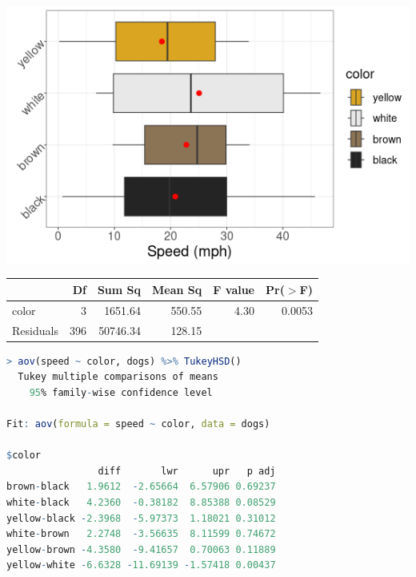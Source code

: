 \documentclass{beamer}
\begin{document}
\begin{frame}
\begin{center}
\includegraphics[scale=0.5]{dog_color_2.png}
\end{center}
\begin{table}[ht]
\centering
\begin{tabular}{lrrrrr}
  \hline
 & Df & Sum Sq & Mean Sq & F value & Pr($>$F) \\ 
  \hline
color       & 3 & 1651.64 & 550.55 & 4.30 & 0.0053 \\ 
  Residuals   & 396 & 50746.34 & 128.15 &  &  \\ 
   \hline
\end{tabular}
\end{table}
\end{frame}

\begin{frame}[fragile]

\begin{lstlisting}[language=R]
> aov(speed ~ color, dogs) %>% TukeyHSD() 
  Tukey multiple comparisons of means
    95% family-wise confidence level

Fit: aov(formula = speed ~ color, data = dogs)

$color
                diff       lwr      upr   p adj
brown-black   1.9612  -2.65664  6.57906 0.69237
white-black   4.2360  -0.38182  8.85388 0.08529
yellow-black -2.3968  -5.97373  1.18021 0.31012
white-brown   2.2748  -3.56635  8.11599 0.74672
yellow-brown -4.3580  -9.41657  0.70063 0.11889
yellow-white -6.6328 -11.69139 -1.57418 0.00437
\end{lstlisting}

\end{frame}
\end{document}

